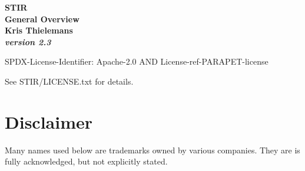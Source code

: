 \documentclass{article}
\begin{document}
\begin{center}

\begin{spacing}{1.5}
\textbf{{\huge STIR \\
General Overview}}\\
\textbf{Kris Thielemans}\\
\textbf{\textit{version 2.3}}


\end{spacing}

SPDX-License-Identifier: Apache-2.0 AND License-ref-PARAPET-license

See STIR/LICENSE.txt for details.

\end{center}

\tableofcontents 


\section{
Disclaimer}
Many names used below are trademarks owned by various companies. They are
is fully acknowledged, but not explicitly stated.
\end{document}
